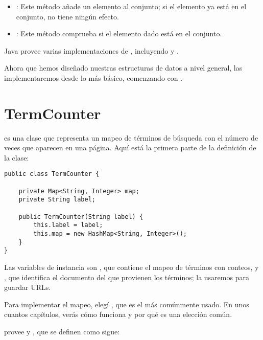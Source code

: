 \documentclass[12pt]{book}
\theoremstyle{exercise}
\begin{document}
\begin{itemize}

\item
  : Este método añade un elemento al conjunto; si el
  elemento ya está en el conjunto, no tiene ningún efecto.

\item
  : Este método comprueba si el elemento dado
  está en el conjunto.

\end{itemize}

Java provee varias implementaciones de , incluyendo
 y .


Ahora que hemos diseñado nuestras estructuras de datos a nivel general,
las implementaremos desde lo más básico, comenzando con .


\section{TermCounter}
\label{termcounter}


 es una clase que representa un mapeo de términos de búsqueda con
el número de veces que aparecen en una página. Aquí está la primera
parte de la definición de la clase:

\begin{verbatim}
public class TermCounter {

    private Map<String, Integer> map;
    private String label;

    public TermCounter(String label) {
        this.label = label;
        this.map = new HashMap<String, Integer>();
    }
}
\end{verbatim}

Las variables de instancia son , que contiene el mapeo de
términos con conteos, y , que identifica el documento del
que provienen los términos; la usaremos para guardar URLs.


Para implementar el mapeo, elegí , que es el  más
comúnmente usado. En unos cuantos capítulos, verás cómo funciona y por qué
es una elección común.

 provee  y , que se
definen como sigue:
\end{document}

